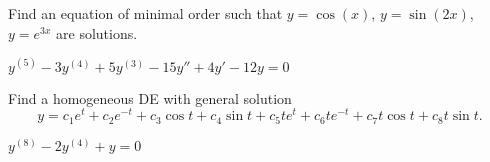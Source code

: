 \begin{exercise}
Find an equation of minimal order such that $y=\cos(x)$, $y=\sin(2x)$, $y=e^{3x}$ are solutions.
\end{exercise}
\comboSol{%
}
{%
$y^{(5)} - 3y^{(4)} + 5y^{(3)} - 15y'' + 4y' - 12y = 0$
}

\begin{exercise}
Find a homogeneous DE with general solution %
$$y=c_1e^t+ c_2e^{-t}+ c_3\cos t+ c_4\sin t + c_5te^t+ c_6te^{-t}+ c_7t\cos t+ c_8t\sin t.$$
\end{exercise}
\comboSol{%
}
{%
$y^{(8)} - 2y^{(4)} + y = 0$
}



\setcounter{exercise}{100}

